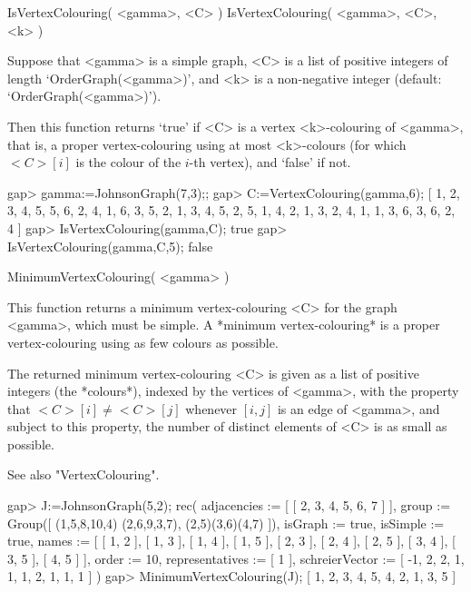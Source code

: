 
\>IsVertexColouring( <gamma>, <C> )
\>IsVertexColouring( <gamma>, <C>, <k> )

Suppose that <gamma> is a simple graph, <C> is a list of positive integers
of length `OrderGraph(<gamma>)', and <k> is a non-negative integer
(default: `OrderGraph(<gamma>)').

Then this function returns `true' if <C> is a vertex <k>-colouring of
<gamma>, that is, a proper vertex-colouring using at most <k>-colours (for
which $<C>[i]$ is the colour of the $i$-th vertex), and `false' if not.

\beginexample
gap> gamma:=JohnsonGraph(7,3);;
gap> C:=VertexColouring(gamma,6);
[ 1, 2, 3, 4, 5, 5, 6, 2, 4, 1, 6, 3, 5, 2, 1, 3, 4, 5, 2, 5, 1, 4, 2, 1, 3, 
  2, 4, 1, 1, 3, 6, 3, 6, 2, 4 ]
gap> IsVertexColouring(gamma,C);
true
gap> IsVertexColouring(gamma,C,5);
false
\endexample


\>MinimumVertexColouring( <gamma> )

This function returns a minimum vertex-colouring <C> for the graph
<gamma>, which must be simple. A *minimum vertex-colouring*
is a proper vertex-colouring using as few colours as possible.

The returned minimum vertex-colouring <C> is given as a list of positive
integers (the *colours*), indexed by the vertices of <gamma>, with the
property that $<C>[i]\not=<C>[j]$ whenever $[i,j]$ is an edge of <gamma>,
and subject to this property, the number of distinct elements of <C>
is as small as possible.

See also "VertexColouring".

\beginexample
gap> J:=JohnsonGraph(5,2);
rec( adjacencies := [ [ 2, 3, 4, 5, 6, 7 ] ], group := Group([ (1,5,8,10,4)
  (2,6,9,3,7), (2,5)(3,6)(4,7) ]), isGraph := true, isSimple := true, 
  names := [ [ 1, 2 ], [ 1, 3 ], [ 1, 4 ], [ 1, 5 ], [ 2, 3 ], [ 2, 4 ], 
      [ 2, 5 ], [ 3, 4 ], [ 3, 5 ], [ 4, 5 ] ], order := 10, 
  representatives := [ 1 ], schreierVector := [ -1, 2, 2, 1, 1, 1, 2, 1, 1, 1 
     ] )
gap> MinimumVertexColouring(J);
[ 1, 2, 3, 4, 5, 4, 2, 1, 3, 5 ]
\endexample



